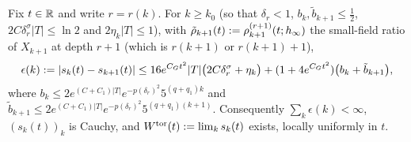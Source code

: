 \begin{lemma}\label{rot:lem:H6B}
Fix $t\in\mathbb R$ and write $r=r(k)$. For $k\ge k_0$ (so that $\delta_r<1$, $b_k,\tilde b_{k+1}\le\frac12$, $2C\delta_r^\sigma|T|\le\ln2$ and $2\eta_k|T|\le1$), with $\tilde\rho_{k+1}(t):=\rho^{(r+1)}_{k+1}(t;h_\infty)$ the small-field ratio of $X_{k+1}$ at depth $r+1$ (which is $r(k+1)$ or $r(k+1)+1$),
\[
\epsilon(k):=|s_k(t)-s_{k+1}(t)|\le16e^{C_Gt^2}|T|\big(2C\delta_r^\sigma+\eta_k\big)+(1+4e^{C_Gt^2})\big(b_k+\tilde b_{k+1}\big),
\]
where $b_k\le2e^{(C+C_1)|T|}e^{-p(\delta_r)^2}5^{(q+q_1)k}$ and $\tilde b_{k+1}\le2e^{(C+C_1)|T|}e^{-p(\delta_r)^2}5^{(q+q_1)(k+1)}$. Consequently $\sum_k\epsilon(k)<\infty$, $(s_k(t))_k$ is Cauchy, and $W^{\rm tor}(t):=\lim_ks_k(t)$ exists, locally uniformly in $t$.
\end{lemma}
